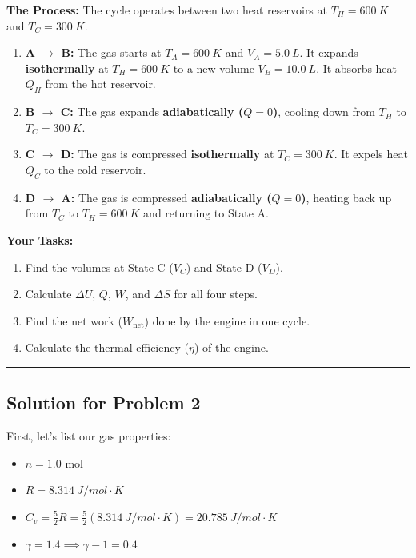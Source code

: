 \documentclass[article]{article}
\begin{document}
\textbf{The Process:}
The cycle operates between two heat reservoirs at $T_H = \SI{600}{K}$ and $T_C = \SI{300}{K}$.

\begin{enumerate}
    \item \textbf{A $\to$ B:} The gas starts at $T_A = \SI{600}{K}$ and $V_A = \SI{5.0}{L}$. It expands \textbf{isothermally} at $T_H = \SI{600}{K}$ to a new volume $V_B = \SI{10.0}{L}$. It absorbs heat $Q_H$ from the hot reservoir.
    \item \textbf{B $\to$ C:} The gas expands \textbf{adiabatically ($Q=0$)}, cooling down from $T_H$ to $T_C = \SI{300}{K}$.
    \item \textbf{C $\to$ D:} The gas is compressed \textbf{isothermally} at $T_C = \SI{300}{K}$. It expels heat $Q_C$ to the cold reservoir.
    \item \textbf{D $\to$ A:} The gas is compressed \textbf{adiabatically ($Q=0$)}, heating back up from $T_C$ to $T_H = \SI{600}{K}$ and returning to State A.
\end{enumerate}

\textbf{Your Tasks:}

\begin{enumerate}
    \item Find the volumes at State C ($V_C$) and State D ($V_D$).
    \item Calculate $\Delta U$, $Q$, $W$, and $\Delta S$ for all four steps.
    \item Find the net work ($W_{\text{net}}$) done by the engine in one cycle.
    \item Calculate the thermal efficiency ($\eta$) of the engine.
\end{enumerate}

\hrule

\subsection{Solution for Problem 2}

First, let's list our gas properties:
\begin{itemize}
    \item $n = 1.0 \text{ mol}$
    \item $R = \SI{8.314}{J/mol\cdot K}$
    \item $C_v = \frac{5}{2}R = \frac{5}{2}(\SI{8.314}{J/mol\cdot K}) = \SI{20.785}{J/mol\cdot K}$
    \item $\gamma = 1.4 \implies \gamma - 1 = 0.4$
\end{itemize}
\end{document}
